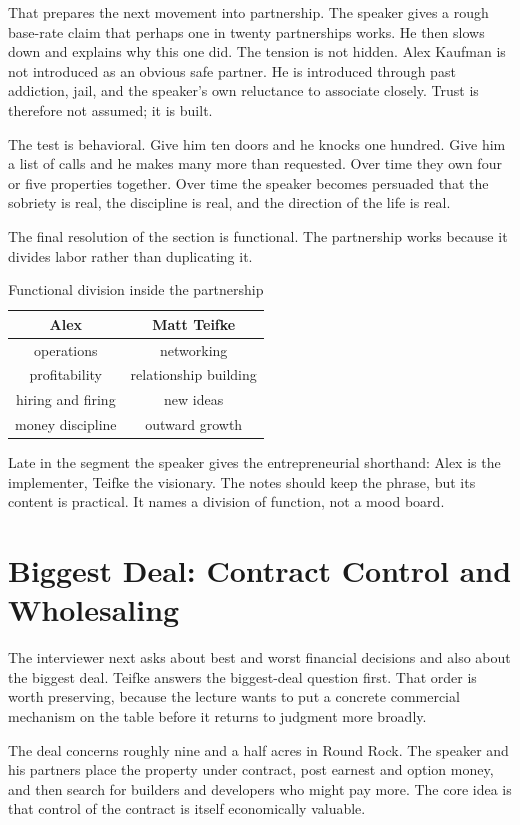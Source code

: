 That prepares the next movement into partnership. The speaker gives a rough base-rate claim that perhaps one in twenty partnerships works. He then slows down and explains why this one did. The tension is not hidden. Alex Kaufman is not introduced as an obvious safe partner. He is introduced through past addiction, jail, and the speaker's own reluctance to associate closely. Trust is therefore not assumed; it is built.

The test is behavioral. Give him ten doors and he knocks one hundred. Give him a list of calls and he makes many more than requested. Over time they own four or five properties together. Over time the speaker becomes persuaded that the sobriety is real, the discipline is real, and the direction of the life is real.

The final resolution of the section is functional. The partnership works because it divides labor rather than duplicating it.
\begin{table}[h]
\centering
\caption{Functional division inside the partnership}
\begin{tabular}{|c|c|}
\hline
Alex & Matt Teifke \\
\hline
operations & networking \\
profitability & relationship building \\
hiring and firing & new ideas \\
money discipline & outward growth \\
\hline
\end{tabular}
\end{table}

Late in the segment the speaker gives the entrepreneurial shorthand: Alex is the implementer, Teifke the visionary. The notes should keep the phrase, but its content is practical. It names a division of function, not a mood board.

\section{Biggest Deal: Contract Control and Wholesaling}

The interviewer next asks about best and worst financial decisions and also about the biggest deal. Teifke answers the biggest-deal question first. That order is worth preserving, because the lecture wants to put a concrete commercial mechanism on the table before it returns to judgment more broadly.

The deal concerns roughly nine and a half acres in Round Rock. The speaker and his partners place the property under contract, post earnest and option money, and then search for builders and developers who might pay more. The core idea is that control of the contract is itself economically valuable.

